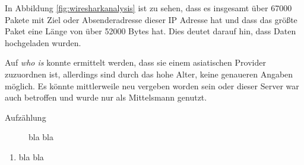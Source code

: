 In Abbildung \ref{fig:wiresharkanalysis} ist zu sehen, dass es insgesamt über 67000 Pakete mit Ziel oder Absenderadresse dieser IP Adresse hat und dass das größte Paket eine Länge von über 52000 Bytes hat. Dies deutet darauf hin, dass Daten hochgeladen wurden.

Auf \textit{who is} konnte ermittelt werden, dass sie einem asiatischen Provider zuzuordnen ist, allerdings sind durch das hohe Alter, keine genaueren Angaben möglich. Es könnte mittlerweile neu vergeben worden sein oder dieser Server war auch betroffen und wurde nur als Mittelsmann genutzt.


\begin{description}
	\item[Aufzählung] bla bla
\end{description}

\begin{enumerate}
	\item bla bla 
\end{enumerate}


